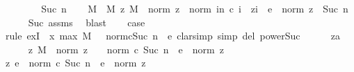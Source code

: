 \begin{isabellebody}
\ \ \ \ \isamarkupfalse%
\isanewline
{}\isamarkupfalse%
\isanewline
\ \ \isamarkupfalse%
\ {\isacharparenleft}{\kern0pt}Suc\ n{\isacharparenright}{\kern0pt}\isanewline
\ \ \isamarkupfalse%
\ M\ \ M{\isacharcolon}{\kern0pt}\ {\isachardoublequoteopen}{\isasymAnd}z{\isachardot}{\kern0pt}\ M\ {\isasymle}\ norm\ z\ {\isasymLongrightarrow}\ norm\ {\isacharparenleft}{\kern0pt}{\isasymSum}i{\isasymle}n{\isachardot}{\kern0pt}\ c\ i\ {\isacharasterisk}{\kern0pt}\ z{\isacharcircum}{\kern0pt}i{\isacharparenright}{\kern0pt}\ {\isasymle}\ e\ {\isacharasterisk}{\kern0pt}\ norm\ z\ {\isacharcircum}{\kern0pt}\ Suc\ n{\isachardoublequoteclose}\isanewline
\ \ \ \ \isamarkupfalse%
\ Suc\ assms\ \isamarkupfalse%
\ blast\isanewline
\ \ \isamarkupfalse%
\ {\isacharquery}{\kern0pt}case\isanewline
\ \ \isamarkupfalse%
\ {\isacharparenleft}{\kern0pt}rule\ exI\ {\isacharbrackleft}{\kern0pt}\ x{\isacharequal}{\kern0pt}\ {\isachardoublequoteopen}max\ M\ {\isacharparenleft}{\kern0pt}{}\ {\isacharplus}{\kern0pt}\ norm{\isacharparenleft}{\kern0pt}c{\isacharparenleft}{\kern0pt}Suc\ n{\isacharparenright}{\kern0pt}{\isacharparenright}{\kern0pt}\ {\isacharslash}{\kern0pt}\ e{\isacharparenright}{\kern0pt}{\isachardoublequoteclose}{\isacharbrackright}{\kern0pt}{\isacharcomma}{\kern0pt}\ clarsimp\ simp\ del{\isacharcolon}{\kern0pt}\ power{\isacharunderscore}{\kern0pt}Suc{\isacharparenright}{\kern0pt}\isanewline
\ \ \ \ \isamarkupfalse%
\ z{\isacharcolon}{\kern0pt}{\isacharcolon}{\kern0pt}{\isacharprime}{\kern0pt}a\isanewline
\ \ \ \ \isamarkupfalse%
\ z{}{\isacharcolon}{\kern0pt}\ {\isachardoublequoteopen}M\ {\isasymle}\ norm\ z{\isachardoublequoteclose}\ \ {\isachardoublequoteopen}{}\ {\isacharplus}{\kern0pt}\ norm\ {\isacharparenleft}{\kern0pt}c\ {\isacharparenleft}{\kern0pt}Suc\ n{\isacharparenright}{\kern0pt}{\isacharparenright}{\kern0pt}\ {\isacharslash}{\kern0pt}\ e\ {\isasymle}\ norm\ z{\isachardoublequoteclose}\isanewline
\ \ \ \ \isamarkupfalse%
\ \isamarkupfalse%
\ z{}{\isacharcolon}{\kern0pt}\ {\isachardoublequoteopen}e\ {\isacharplus}{\kern0pt}\ norm\ {\isacharparenleft}{\kern0pt}c\ {\isacharparenleft}{\kern0pt}Suc\ n{\isacharparenright}{\kern0pt}{\isacharparenright}{\kern0pt}\ {\isasymle}\ e\ {\isacharasterisk}{\kern0pt}\ norm\ z{\isachardoublequoteclose}\isanewline
\ \ \ \ \ \ \isamarkupfalse%

\end{isabellebody}
